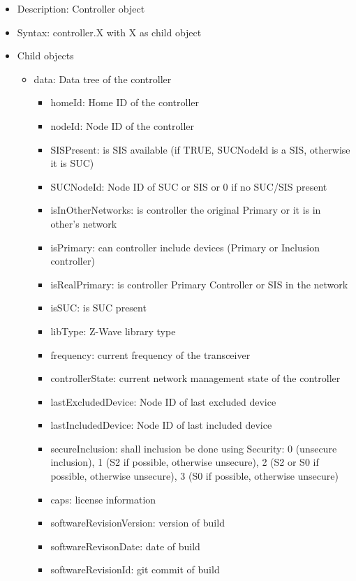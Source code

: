 \begin {itemize}
\item Description: Controller object
\item Syntax: controller.X with  X as child object
\item Child objects
\begin {itemize}
\item data: Data tree of the controller
\begin {itemize}
\item  homeId: Home ID of the controller
\item  nodeId: Node ID of the controller
\item  SISPresent: is SIS available (if TRUE, SUCNodeId is a SIS, otherwise it is SUC)
\item  SUCNodeId: Node ID of SUC or SIS or 0 if no SUC/SIS present
\item  isInOtherNetworks: is controller the original Primary or it is in other's network
\item  isPrimary: can controller include devices (Primary or Inclusion controller)
\item  isRealPrimary: is controller Primary Controller or SIS in the network
\item  isSUC: is SUC present
\item  libType: Z-Wave library type
\item  frequency: current frequency of the transceiver

\item  controllerState: current network management state of the controller
\item  lastExcludedDevice: Node ID of last excluded device
\item  lastIncludedDevice: Node ID of last included device
\item  secureInclusion: shall inclusion be done using Security: 0 (unsecure inclusion), 1 (S2 if possible, otherwise unsecure), 2 (S2 or S0 if possible, otherwise unsecure), 3 (S0 if possible, otherwise unsecure)

\item  caps: \zway license information
\item  softwareRevisionVersion: version of \zway build
\item  softwareRevisonDate: date of \zway build
\item  softwareRevisionId: git commit of \zway build


\end{itemize}
\end{itemize}
\end{itemize}
